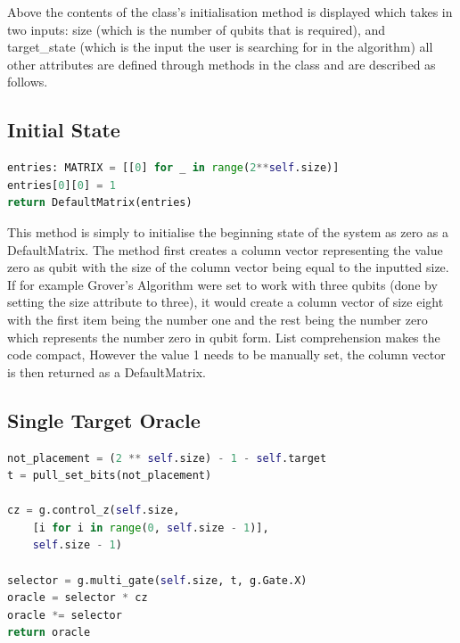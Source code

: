 \documentclass{article}
\begin{document}
Above the contents of the class's initialisation method is displayed which takes in two inputs: size (which is the number of qubits that is required), and target\_state (which is the input the user is searching for in the algorithm) all other attributes are defined through methods in the class and are described as follows.

\subsection{Initial State}

\begin{file}
\begin{lstlisting}[language=Python]
entries: MATRIX = [[0] for _ in range(2**self.size)]
entries[0][0] = 1
return DefaultMatrix(entries)
\end{lstlisting}
\end{file}

This method is simply to initialise the beginning state of the system as zero as a DefaultMatrix. The method first creates a column vector representing the value zero as qubit with the size of the column vector being equal to the inputted size. If for example Grover's Algorithm were set to work with three qubits (done by setting the size attribute to three), it would create a column vector of size eight with the first item being the number one and the rest being the number zero which represents the number zero in qubit form. List comprehension makes the code compact, However the value 1 needs to be manually set, the column vector is then returned as a DefaultMatrix. 

\subsection{Single Target Oracle}

\begin{file}
\begin{lstlisting}[language=Python]
not_placement = (2 ** self.size) - 1 - self.target
t = pull_set_bits(not_placement)

cz = g.control_z(self.size, 
	[i for i in range(0, self.size - 1)],
	self.size - 1)
	
selector = g.multi_gate(self.size, t, g.Gate.X)
oracle = selector * cz
oracle *= selector
return oracle

\end{lstlisting}
\end{file}
\end{document}
